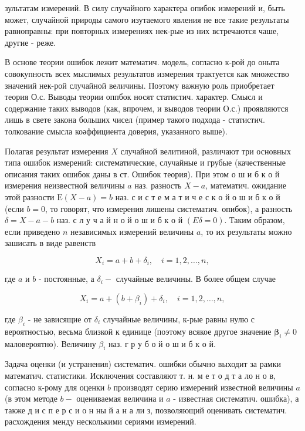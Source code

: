 \documentclass[10pt]{article}
\begin{document}
зультатам измерений. В силу случайного характера опибок измерений и, быть может, случайной природы самого изутаемого явления не все такие результаты равноправны: при повторных измерениях нек-рые из них встречаются чаше, другие - реже.



В основе теории ошибок лежит математич. модель, согласно к-рой до оныта совокупность всех мыслимых результатов измерения трактуется как множество значений нек-рой случайной величины. Поэтому важную роль приобретает теория О.с. Выводы теории оппбок носят статистич. характер. Смысл и содержание таких выводов (как, впрочем, и выводов теории О.с.) проявляются лишь в свете закона больших чисел (пример такого подхода - статистич. толкование смысла коәффициента доверия, указанного выше).



Полагая результат измерения $X$ случайной велитиной, различают три основных типа ошибок измерений: систематические, случайные и грубые (качественные описания таких ошибок даны в ст. Ошибок теория). При этом о ш и б к о й измерения неизвестной величины $a$ наз. разность $X-a$, математич. ожидание этой разности $\mathrm{E}(X-a)=b$ наз. с и с т е м а т и ч е с к о й о ш и б к о й (если $b=0$, то говорят, что измерения лишены систематич. опибок), а разность $\delta=X-a-b$ наз. с л у ч а й н о й о ш и б к о й $(E \delta=0)$. Таким образом, если приведено $n$ независимых измерений величины $a$, то их результаты можно зашисать в виде равенств



\[

X_{i}=a+b+\delta_{i}, \quad i=1,2, \ldots, n,

\]



где $a$ и $b$ - постоянные, а $\delta_{i}-$ случайные величины. В более общем случае



\[

X_{i}=a+\left(b+\beta_{i}\right)+\delta_{i}, \quad i=1,2, \ldots, n,

\]



где $\beta_{i}$ - не зависящие от $\delta_{i}$ случайные величины, к-рые равны нулю с вероятностью, весьма близкой к единице (поэтому всякое другое значение $\boldsymbol{\beta}_{i} \neq 0$ маловероятно). Величину $\beta_{i}$ наз. г р у б о й о ш и б к о й.



Задача оценки (и устранения) систематич. ошибки обычно выходит за рамки математич. статистики. Исключения составляют т. н. м е т о д т а ло н о в, согласно к-рому для оценки $b$ производят серию измерений известной величины $a$ (в этом методе $b-$ оцениваемая величина и $a$ - известная систематич. ошибка), а также д и с п е р с и о н ны й а н а ли з, позволяющий оценивать систематич. расхождения менду несколькими сериями измерений.
\end{document}
